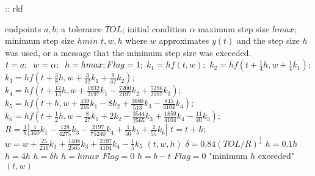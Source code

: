 \documentclass[12pt,oneside]{book}
\begin{document}
\begin{spacing}{1.2}
				\begin{algorithm}[H]
					\caption{:: \ac{rkf}}
					\begin{algorithmic}[1]
						\REQUIRE endpoints $ a, b $; \hspace*{0.2cm} a tolerance $ TOL $; \hspace*{0.2cm} initial condition $ \alpha $ \hspace*{0.2cm} maximum step size $ hmax $; \hspace*{0.2cm} minimum step size $ hmin $
						\ENSURE $ t, w, h $ where $ w $ approximates $ y(t) $ and the step size $ h $ was used, or a message that the minimum step size was exceeded.
						\STATE $ t = a; \hspace*{0.2cm} w = \alpha; \hspace*{0.2cm} h = hmax; Flag=1; $
							\STATE $ k_1 = hf(t,w); $
							\STATE $ k_2 = hf(t + \frac{1}{4}h, w + \frac{1}{4}k_1); $
							\STATE $ k_3 = hf(t + \frac{3}{8}h, w + \frac{3}{32}k_1 + \frac{9}{32}k_2); $
							\STATE $ k_4 = hf(t + \frac{12}{13}h, w + \frac{1932}{2197}k_1 - \frac{7200}{2197}k_2 + \frac{7296}{2197}k_3); $
							\STATE $ k_5 = hf(t + h, w + \frac{439}{216}k_1 - 8k_2 + \frac{3680}{513}k_3 - \frac{845}{4104}k_4); $
							\STATE $ k_6 = hf(t + \frac{1}{2}h, w - \frac{8}{27}k_1 + 2k_2 - \frac{3544}{2565}k_3 + \frac{1859}{4104}k_4 - \frac{11}{40}k_5); $
							\STATE $ R = \frac{1}{h} | \frac{1}{360}k_1 - \frac{128}{4275}k_3 - \frac{2197}{75240}k_4 + \frac{1}{50}k_5 + \frac{2}{55}k_6 | $ \hspace*{0.5cm} 
								\STATE $ t = t + h; $
								\STATE $ w = w + \frac{25}{216}k_1 + \frac{1408}{2565}k_3 + \frac{2197}{4104}k_4 - \frac{1}{5}k_5 $
								\RETURN $ (t, w, h) $
							\ENDIF
							\STATE $ \delta = 0.84 (TOL/R)^{\frac{1}{4}} $
								\STATE $ h = 0.1h $\hspace*{0.5cm} 
								\STATE $ h = 4h $
							\ELSE
								\STATE $ h = \delta h $
							\ENDIF
								\STATE $ h = hmax $
							\ENDIF
								\STATE $ Flag = 0 $
								\STATE $ h = b - t $
								\STATE $ Flag = 0 $
								\PRINT "minimum $ h $ exceeded" \hspace*{0.5cm} 
							\ENDIF
						\ENDWHILE
						\RETURN $ (t, w) $
					\end{algorithmic}
				\end{algorithm}
			
		\end{spacing}
		
\end{document}
